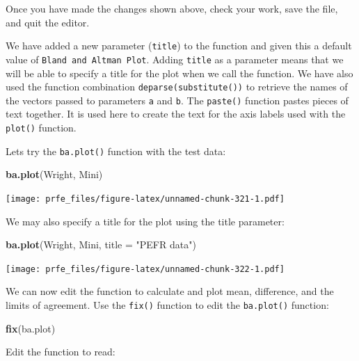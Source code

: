 \documentclass[12pt,a4paper]{book}
\newenvironment{Shaded}{\begin{snugshade}}{\end{snugshade}}
\newcommand{\DataTypeTok}[1]{\textcolor[rgb]{0.13,0.29,0.53}{#1}}
\newcommand{\KeywordTok}[1]{\textcolor[rgb]{0.13,0.29,0.53}{\textbf{#1}}}
\newcommand{\NormalTok}[1]{#1}
\newcommand{\StringTok}[1]{\textcolor[rgb]{0.31,0.60,0.02}{#1}}
\theoremstyle{definition}
\theoremstyle{definition}
\theoremstyle{definition}
\theoremstyle{remark}
\begin{document}
Once you have made the changes shown above, check your work, save the
file, and quit the editor.

We have added a new parameter (\texttt{title}) to the function and given
this a default value of \texttt{Bland\ and\ Altman\ Plot}. Adding
\texttt{title} as a parameter means that we will be able to specify a
title for the plot when we call the function. We have also used the
function combination \texttt{deparse(substitute())} to retrieve the
names of the vectors passed to parameters \texttt{a} and \texttt{b}. The
\texttt{paste()} function pastes pieces of text together. It is used
here to create the text for the axis labels used with the
\texttt{plot()} function.

Lets try the \texttt{ba.plot()} function with the test data:

\begin{Shaded}
\begin{Highlighting}[]
\KeywordTok{ba.plot}\NormalTok{(Wright, Mini)}
\end{Highlighting}
\end{Shaded}

\texttt{[image: prfe\_files/figure-latex/unnamed-chunk-321-1.pdf]}

We may also specify a title for the plot using the title parameter:

\begin{Shaded}
\begin{Highlighting}[]
\KeywordTok{ba.plot}\NormalTok{(Wright, Mini, }\DataTypeTok{title =} \StringTok{"PEFR data"}\NormalTok{)}
\end{Highlighting}
\end{Shaded}

\texttt{[image: prfe\_files/figure-latex/unnamed-chunk-322-1.pdf]}

We can now edit the function to calculate and plot mean, difference, and
the limits of agreement. Use the \texttt{fix()} function to edit the
\texttt{ba.plot()} function:

\begin{Shaded}
\begin{Highlighting}[]
\KeywordTok{fix}\NormalTok{(ba.plot)}
\end{Highlighting}
\end{Shaded}

Edit the function to read:
\end{document}
